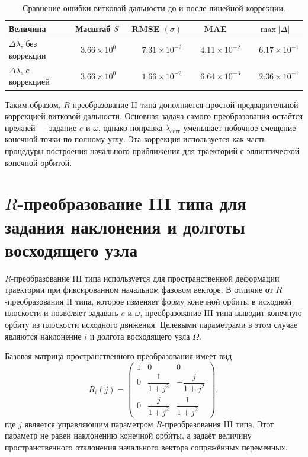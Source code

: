 \begin{table}[ht]
	\centering
	\caption{Сравнение ошибки витковой дальности до и после линейной коррекции.}
	\label{tab:R_type_II_lambda_correction_before_after}
	\begin{tabular}{lcccc}
		\toprule
		Величина & Масштаб \(S\) & RMSE \((\sigma)\) & MAE & \(\max |\Delta|\) \\
		\midrule
		\(\Delta\lambda\), без коррекции & \(\phantom{-}3.66\times10^{0\phantom{-}}\) & \(\phantom{-}7.31\times10^{-2}\) & \(\phantom{-}4.11\times10^{-2}\) & \(\phantom{-}6.17\times10^{-1}\) \\
		\(\Delta\lambda\), с коррекцией & \(\phantom{-}3.66\times10^{0\phantom{-}}\) & \(\phantom{-}1.66\times10^{-2}\) & \(\phantom{-}6.64\times10^{-3}\) & \(\phantom{-}2.36\times10^{-1}\) \\
		\bottomrule
	\end{tabular}
\end{table}

Таким образом, \(R\)-преобразование II типа дополняется простой предварительной коррекцией витковой дальности. Основная задача самого преобразования остаётся прежней --- задание \(e\) и \(\omega\), однако поправка \(\lambda_{\mathrm{corr}}\) уменьшает побочное смещение конечной точки по полному углу. Эта коррекция используется как часть процедуры построения начального приближения для траекторий с эллиптической конечной орбитой.

\section{\(R\)-преобразование III типа для задания наклонения и долготы восходящего узла}

\(R\)-преобразование III типа используется для пространственной деформации траектории при фиксированном начальном фазовом векторе. В отличие от \(R\)-преобразования II типа, которое изменяет форму конечной орбиты в исходной плоскости и позволяет задавать \(e\) и \(\omega\), преобразование III типа выводит конечную орбиту из плоскости исходного движения. Целевыми параметрами в этом случае являются наклонение \(i\) и долгота восходящего узла \(\Omega\).

Базовая матрица пространственного преобразования имеет вид
\begin{equation}
R_i(j)=
\begin{pmatrix}
	1 & 0 & 0\\
	0 & \dfrac{1}{1+j^2} & -\dfrac{j}{1+j^2}\\
	0 & \dfrac{j}{1+j^2} & \dfrac{1}{1+j^2}
\end{pmatrix},
\end{equation}
где \(j\) является управляющим параметром \(R\)-преобразования III типа. Этот параметр не равен наклонению конечной орбиты, а задаёт величину пространственного отклонения начального вектора сопряжённых переменных.

